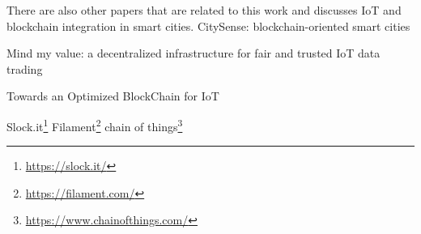 There are also other papers that are related to this work and discusses IoT and blockchain integration in smart cities. 
CitySense: blockchain-oriented smart cities\cite{ibba_citysense:_2017}

Mind my value: a decentralized infrastructure for fair and trusted IoT data trading\cite{missier_mind_2017}

Towards an Optimized BlockChain for IoT\cite{dorri_towards_2017}


Slock.it\footnote{\url{https://slock.it/}}
Filament\footnote{\url{https://filament.com/}}
chain of things\footnote{\url{https://www.chainofthings.com/}}

